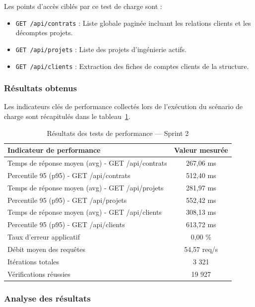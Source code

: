 Les points d'accès ciblés par ce test de charge sont :
\begin{itemize}
    \item \texttt{GET /api/contrats} : Liste globale paginée incluant les relations clients et les décomptes projets.
    \item \texttt{GET /api/projets} : Liste des projets d'ingénierie actifs.
    \item \texttt{GET /api/clients} : Extraction des fiches de comptes clients de la structure.
\end{itemize}

\subsubsection{Résultats obtenus}
Les indicateurs clés de performance collectés lors de l'exécution du scénario de charge sont récapitulés dans le tableau~\ref{tab:perf_sprint2}.
\begin{table}[H]
\centering
\renewcommand{\arraystretch}{1.3}
\small
\begin{tabular}{|l|c|}
\hline
\textbf{Indicateur de performance} & \textbf{Valeur mesurée} \\
\hline
Temps de réponse moyen (avg) - GET /api/contrats & 267,06 ms \\
\hline
Percentile 95 (p95) - GET /api/contrats & 512,40 ms \\
\hline
Temps de réponse moyen (avg) - GET /api/projets & 281,97 ms \\
\hline
Percentile 95 (p95) - GET /api/projets & 552,42 ms \\
\hline
Temps de réponse moyen (avg) - GET /api/clients & 308,13 ms \\
\hline
Percentile 95 (p95) - GET /api/clients & 613,72 ms \\
\hline
Taux d'erreur applicatif & 0,00 \% \\
\hline
Débit moyen des requêtes & 54,57 req/s \\
\hline
Itérations totales & 3 321 \\
\hline
Vérifications réussies & 19 927 \\
\hline
\end{tabular}
\caption{Résultats des tests de performance — Sprint 2}
\label{tab:perf_sprint2}
\end{table}

\subsubsection{Analyse des résultats}

